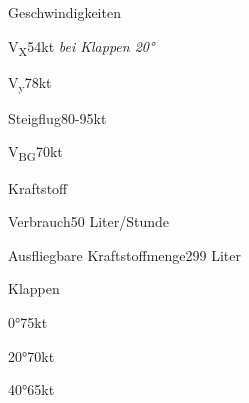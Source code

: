 \begin{task}
  \begin{checklist}{Geschwindigkeiten}
    \item{V\textsubscript{X}}{54kt \textit{bei Klappen 20°}}
    \item{V\textsubscript{y}}{78kt}
    \item{Steigflug}{80-95kt}
    \item{V\textsubscript{BG}}{70kt}
  \end{checklist}
  \begin{checklist}{Kraftstoff}
    \item{Verbrauch}{50 Liter/Stunde}
    \item{Ausfliegbare Kraftstoffmenge}{299 Liter}
  \end{checklist}
  \begin{checklist}{Klappen}
    \item{0°}{75kt}
    \item{20°}{70kt}
    \item{40°}{65kt}
  \end{checklist}
\end{task}
